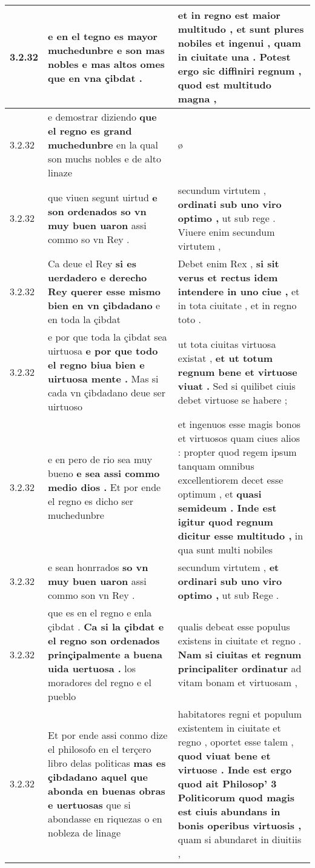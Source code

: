\begin{tabular}{|p{1cm}|p{6.5cm}|p{6.5cm}|}
3.2.32 & e en el tegno es mayor muchedunbre \textbf{ e son mas nobles e mas altos omes } que en vna çibdat . & et in regno est maior multitudo , \textbf{ et sunt plures nobiles et ingenui , } quam in ciuitate una . Potest ergo sic diffiniri regnum , quod est multitudo magna , \\\hline
3.2.32 & e demostrar diziendo \textbf{ que el regno es grand muchedunbre } en la qual son muchs nobles e de alto linaze & ø \\\hline
3.2.32 & que viuen segunt uirtud \textbf{ e son ordenados so vn muy buen uaron } assi commo so vn Rey . & secundum virtutem , \textbf{ ordinati sub uno viro optimo , } ut sub rege . Viuere enim secundum virtutem , \\\hline
3.2.32 & Ca deue el Rey \textbf{ si es uerdadero e derecho Rey querer esse mismo bien en vn çibdadano } e en toda la çibdat & Debet enim Rex , \textbf{ si sit verus et rectus idem intendere in uno ciue , } et in tota ciuitate , et in regno toto . \\\hline
3.2.32 & e por que toda la çibdat sea uirtuosa \textbf{ e por que todo el regno biua bien e uirtuosa mente . } Mas si cada vn çibdadano deue ser uirtuoso & ut tota ciuitas virtuosa existat , \textbf{ et ut totum regnum bene et virtuose viuat . } Sed si quilibet ciuis debet virtuose se habere ; \\\hline
3.2.32 & e en pero de rio sea muy bueno \textbf{ e sea assi commo medio dios . } Et por ende el regno es dicho ser muchedunbre & et ingenuos esse magis bonos et virtuosos quam ciues alios : propter quod regem ipsum tanquam omnibus excellentiorem decet esse optimum , et \textbf{ quasi semideum . Inde est igitur quod regnum dicitur esse multitudo , } in qua sunt multi nobiles \\\hline
3.2.32 & e sean honrrados \textbf{ so vn muy buen uaron } assi commo son vn Rey . & secundum virtutem , \textbf{ et ordinari sub uno viro optimo , } ut sub Rege . \\\hline
3.2.32 & que es en el regno e enla çibdat . \textbf{ Ca si la çibdat e el regno son ordenados prinçipalmente a buena uida uertuosa . } los moradores del regno e el pueblo & qualis debeat esse populus existens in ciuitate et regno . \textbf{ Nam si ciuitas et regnum principaliter ordinatur } ad vitam bonam et virtuosam , \\\hline
3.2.32 & Et por ende assi conmo dize el philosofo en el terçero libro delas politicas \textbf{ mas es çibdadano aquel que abonda en buenas obras e uertuosas } que si abondasse en riquezas o en nobleza de linage & habitatores regni et populum existentem in ciuitate et regno , oportet esse talem , \textbf{ quod viuat bene et virtuose . Inde est ergo quod ait Philosop’ 3 Politicorum quod magis est ciuis abundans in bonis operibus virtuosis , } quam si abundaret in diuitiis , \\\hline

\end{tabular}
